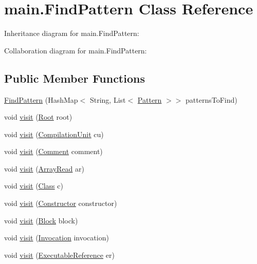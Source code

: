 \hypertarget{classmain_1_1_find_pattern}{}\section{main.\+Find\+Pattern Class Reference}
\label{classmain_1_1_find_pattern}


Inheritance diagram for main.\+Find\+Pattern\+:


Collaboration diagram for main.\+Find\+Pattern\+:
\subsection*{Public Member Functions}
\begin{DoxyCompactItemize}
\item 
\hyperlink{classmain_1_1_find_pattern_a507de1ab97cb405fd7094cedb38a6b8c}{Find\+Pattern} (Hash\+Map$<$ String, List$<$ \hyperlink{classmain_1_1_pattern}{Pattern} $>$$>$ patterns\+To\+Find)
\item 
void \hyperlink{classmain_1_1_find_pattern_a11c7c0e93878aee8d3ae7757e8c69a1d}{visit} (\hyperlink{classparser_1_1_root}{Root} root)
\item 
void \hyperlink{classmain_1_1_find_pattern_a6e5cd7b99267074313734993973d8ae5}{visit} (\hyperlink{classparser_1_1_compilation_unit}{Compilation\+Unit} cu)
\item 
void \hyperlink{classmain_1_1_find_pattern_a390e63794bb999e648ddcdac2ccf01ac}{visit} (\hyperlink{classparser_1_1_comment}{Comment} comment)
\item 
void \hyperlink{classmain_1_1_find_pattern_a33a051b05002ca3bf576409bbb895652}{visit} (\hyperlink{classparser_1_1_array_read}{Array\+Read} ar)
\item 
void \hyperlink{classmain_1_1_find_pattern_aa9229d4903133cab095952bd390e8fe3}{visit} (\hyperlink{classparser_1_1_class}{Class} c)
\item 
void \hyperlink{classmain_1_1_find_pattern_a23f36a9730f08ec44ed7782604dd02c3}{visit} (\hyperlink{classparser_1_1_constructor}{Constructor} constructor)
\item 
void \hyperlink{classmain_1_1_find_pattern_a0c41bb68d41e46187d33ebf1100fd7d5}{visit} (\hyperlink{classparser_1_1_block}{Block} block)
\item 
void \hyperlink{classmain_1_1_find_pattern_a5e8455dca876e833d13311a9d739cf23}{visit} (\hyperlink{classparser_1_1_invocation}{Invocation} invocation)
\item 
void \hyperlink{classmain_1_1_find_pattern_a2c68e93e6d63eef721fe953e53fd721b}{visit} (\hyperlink{classparser_1_1_executable_reference}{Executable\+Reference} er)
$$
\end{DoxyCompactItemize}

